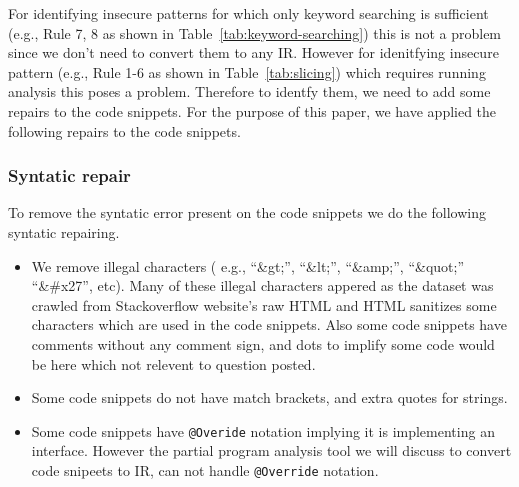 For identifying insecure patterns for which only keyword searching is sufficient (e.g., Rule 7, 8 as shown in Table~\ref{tab:keyword-searching}) this is not a problem since we don't need to convert them to any IR. However for idenitfying insecure pattern (e.g., Rule 1-6 as shown in Table~\ref{tab:slicing}) which requires running analysis this poses a problem. Therefore to identfy them, we need to add some repairs to the code snippets. For the purpose of this paper, we have applied the following repairs to the code snippets.

\subsubsection{Syntatic repair}
To remove the syntatic error present on the code snippets we do the following syntatic repairing.
  \begin{itemize}
    \item We remove illegal characters ( e.g., ``\&gt;'', ``\&lt;'', ``\&amp;'', ``\&quot;'' ``\&\#x27'', etc). Many of these illegal characters appered as the dataset was crawled from Stackoverflow website's raw HTML and HTML sanitizes some characters which are used in the code snippets. Also some code snippets have comments without any comment sign, and dots to implify some code would be here which not relevent to question posted.    
    \item Some code snippets do not have match brackets, and extra quotes for strings. 
    \item Some code snippets have \texttt{@Overide} notation implying it is implementing an interface. However the partial program analysis tool we will discuss to convert code snipeets to IR, can not handle \texttt{@Override} notation.
  \end{itemize}
     

